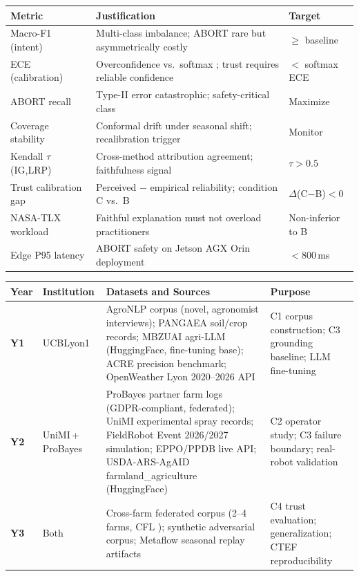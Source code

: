 \documentclass[11pt,a4paper]{article}
\begin{document}
\begin{center}\small
\begin{tabularx}{\linewidth}{@{}lXl@{}}
\toprule
\textbf{Metric} & \textbf{Justification} & \textbf{Target} \\
\midrule
Macro-F1 (intent)      & Multi-class imbalance; ABORT rare but asymmetrically costly \citep{chen_2021} & $\geq$ baseline \\
ECE (calibration)      & Overconfidence vs.\ softmax \citep{guo_calibration_2017}; trust requires reliable confidence & $<$ softmax ECE \\
ABORT recall           & Type-II error catastrophic; safety-critical class & Maximize \\
Coverage stability     & Conformal drift under seasonal shift; recalibration trigger & Monitor \\
Kendall $\tau$(IG,LRP) & Cross-method attribution agreement; faithfulness signal & $\tau>0.5$ \\
Trust calibration gap  & Perceived $-$ empirical reliability; condition C vs.\ B & $\Delta$(C$-$B)$<0$ \\
NASA-TLX workload      & Faithful explanation must not overload practitioners & Non-inferior to B \\
Edge P95 latency       & ABORT safety on Jetson AGX Orin deployment & $<$800\,ms \\
\bottomrule
\end{tabularx}
\end{center}

\smallskip
\begin{center}\small
\begin{tabularx}{\linewidth}{@{}p{0.55cm}p{2.1cm}Xp{2.3cm}@{}}
\toprule
\textbf{Year} & \textbf{Institution} & \textbf{Datasets and Sources} & \textbf{Purpose} \\
\midrule
\textbf{Y1} & UCBLyon1 & AgroNLP corpus (novel, agronomist interviews); PANGAEA soil/crop records; MBZUAI agri-LLM (HuggingFace, fine-tuning base); ACRE precision benchmark; OpenWeather Lyon 2020--2026 API & C1 corpus construction; C3 grounding baseline; LLM fine-tuning \\[2pt]
\textbf{Y2} & UniMI\,+\,ProBayes & ProBayes partner farm logs (GDPR-compliant, federated); UniMI experimental spray records; FieldRobot Event 2026/2027 simulation; EPPO/PPDB live API; USDA-ARS-AgAID farmland\_agriculture (HuggingFace) & C2 operator study; C3 failure boundary; real-robot validation \\[2pt]
\textbf{Y3} & Both & Cross-farm federated corpus (2--4 farms, CFL \citep{saha_cfl_2024}); synthetic adversarial corpus; Metaflow seasonal replay artifacts & C4 trust evaluation; generalization; CTEF reproducibility \\
\bottomrule
\end{tabularx}
\end{center}
\end{document}
